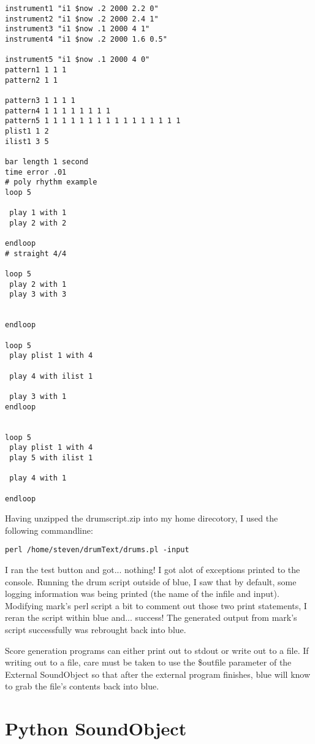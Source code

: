 \begin{verbatim}
instrument1 "i1 $now .2 2000 2.2 0"
instrument2 "i1 $now .2 2000 2.4 1"
instrument3 "i1 $now .1 2000 4 1"
instrument4 "i1 $now .2 2000 1.6 0.5"

instrument5 "i1 $now .1 2000 4 0"
pattern1 1 1 1 
pattern2 1 1

pattern3 1 1 1 1
pattern4 1 1 1 1 1 1 1 1
pattern5 1 1 1 1 1 1 1 1 1 1 1 1 1 1 1 1
plist1 1 2
ilist1 3 5 

bar length 1 second
time error .01
# poly rhythm example
loop 5 

 play 1 with 1
 play 2 with 2

endloop
# straight 4/4

loop 5  
 play 2 with 1
 play 3 with 3


endloop

loop 5 
 play plist 1 with 4

 play 4 with ilist 1 

 play 3 with 1
endloop


loop 5 
 play plist 1 with 4
 play 5 with ilist 1 

 play 4 with 1

endloop
\end{verbatim}

Having unzipped the drumscript.zip into my home direcotory, I used the
following commandline:

\begin{verbatim}
perl /home/steven/drumText/drums.pl -input
\end{verbatim}

I ran the test button and got... nothing! I got alot of exceptions
printed to the console. Running the drum script outside of blue, I saw
that by default, some logging information was being printed (the name of
the infile and input). Modifying mark's perl script a bit to comment out
those two print statements, I reran the script within blue and...
success! The generated output from mark's script successfully was
rebrought back into blue.

Score generation programs can either print out to stdout or write out to
a file. If writing out to a file, care must be taken to use the
\$outfile parameter of the External SoundObject so that after the
external program finishes, blue will know to grab the file's contents
back into blue.

\section{Python SoundObject}

